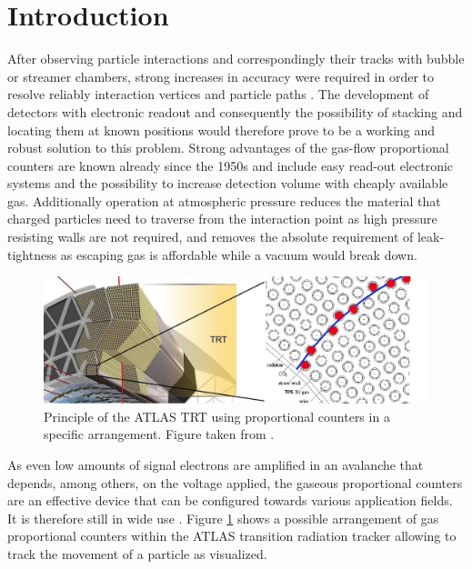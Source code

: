 \section{Introduction}  \label{sec:Introduction}
After observing particle interactions and correspondingly their tracks with
bubble or streamer chambers, strong increases in accuracy were required in order
to resolve reliably interaction vertices and particle paths \cite{charpak_high-resolution_1984}.
The development of detectors with electronic readout and consequently the
possibility of stacking and locating them at known positions would therefore
prove to be a working and robust solution to this problem. Strong advantages of
the gas-flow proportional counters are known already since the 1950s \cite{hendee_gasflow_1956} and include
easy read-out electronic systems and the possibility to increase detection volume
with cheaply available gas. Additionally operation at atmospheric pressure
reduces the material that charged particles need to traverse from the
interaction point as high pressure resisting walls are not required, and removes
the absolute requirement of leak-tightness as escaping gas is affordable while a
vacuum would break down.

\begin{figure}[H]
  \includegraphics[width=\linewidth]{graphics/ATLAS_TRT_Principle_image}
  \caption{Principle of the ATLAS TRT using proportional counters in a specific
    arrangement. Figure taken from \cite{colliderscope}.}
  \label{fig:colliderscope}
\end{figure}

As even low amounts of signal electrons are amplified in an
avalanche that depends, among others, on the voltage applied, the gaseous
proportional counters are an effective device that can be configured towards
various application fields. It is therefore still in wide use
\cite{Mindur:2017nqn}. Figure \ref{fig:colliderscope} shows a possible
arrangement of gas proportional counters within the ATLAS transition radiation
tracker allowing to track the movement of a particle as visualized.

